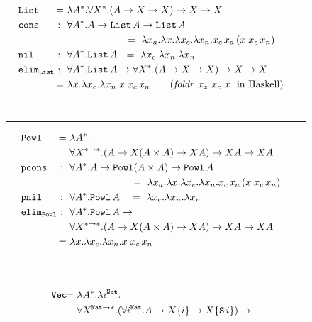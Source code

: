 \begin{figure}
\begin{singlespace}
\begin{align*}
&\!\!\!\!\!\!\mathtt{List} &\!\!\!\!\!=~& \l A^{*}.\forall X^{*}.(A-> X-> X)-> X-> X
	\\
&\!\!\!\!\!\!\texttt{cons} &\!\!\!\!\!:~~& \forall A^{*}.A-> \mathtt{List}\,A-> \mathtt{List}\,A \\
& & & \qquad~\qquad~\quad\, =~\l x_a.\l x.\l x_c.\l x_n. x_c\,x_a\,(x\;x_c\,x_n) \\
&\!\!\!\!\!\!\mathtt{nil} &\!\!\!\!\!:~~& \forall A^{*}.\texttt{List}\,A
~~=~ \l x_c.\l x_n.\l x_n \\
&\!\!\!\!\!\!\mathtt{elim_{List}} &\!\!\!\!:~~& \forall A^{*}.\texttt{List}\,A ->
	\forall X^{*}.(A -> X -> X) -> X -> X \\
& &\!\!\!\!\!=~& \l x.\l x_c. \l x_n.x\;x_c\,x_n\qquad
	\text{(\textit{foldr} $x_z$ $x_c$ $x~$ in Haskell)}
\end{align*}\vspace*{-19pt} \\ \vspace*{-4pt}
\rule{\linewidth}{.4pt}
\begin{align*}
&\!\!\!\!\!\!\mathtt{Powl} &\!\!\!\!\!=~& \l A^{*}.\\
&&&\forall X^{*-> *}.(A-> X(A\times A)-> XA)-> XA -> XA \\
&\!\!\!\!\!\!\texttt{pcons} &\!\!\!\!\!:~~& \forall A^{*}.A-> \mathtt{Powl}(A\times A)-> \mathtt{Powl}\,A \\
&&& \qquad~\qquad~\quad\, ~=~ \l x_a.\l x.\l x_c.\l x_n. x_c\,x_a\,(x\;x_c\,x_n) \\
&\!\!\!\!\!\!\mathtt{pnil} &\!\!\!\!\!:~~& \forall A^{*}.\texttt{Powl}\,A
~~~=~ \l x_c.\l x_n.\l x_n \\
&\!\!\!\!\!\!\mathtt{elim_{Powl}} &\!\!\!\!:~~& \forall A^{*}.\texttt{Powl}\,A -> \\
&&& \forall X^{*-> *}.(A -> X(A\times A) -> XA) -> XA -> XA \\
& &\!\!\!\!\!=~& \l x.\l x_c. \l x_n.x\;x_c\,x_n
\end{align*}\vspace*{-19pt} \\ \vspace*{-4pt}
\rule{\linewidth}{.4pt}
\begin{align*}
&\!\!\!\!\!\!\mathtt{Vec} &\!\!\!\!\!\!\!\!=~& \l A^{*}.\l i^{\mathtt{Nat}}.\\
&&&	\forall X^{\mathtt{Nat}-> *}.
	(\forall i^\mathtt{Nat}.A-> X\{i\}-> X\{\mathtt{S}\,i\}) ->  \\

\end{align*}
\end{singlespace}
\end{figure}
